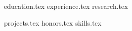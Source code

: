 \documentclass[11pt, a4paper]{awesome-cv}
\begin{document}
\makecvheader


{education.tex}
{experience.tex}
{research.tex}

{projects.tex}
{honors.tex}
{skills.tex}

\end{document}
